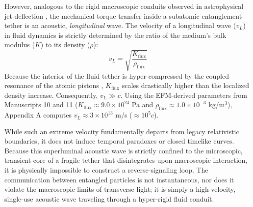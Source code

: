 \documentclass[11pt, a4paper]{article}
\begin{document}
  However, analogous to the rigid macroscopic conduits observed in astrophysical jet deflection \cite{marabut2026m3}, the mechanical torque transfer inside a subatomic entanglement tether is an acoustic, \textit{longitudinal} wave. The velocity of a longitudinal wave ($v_L$) in fluid dynamics is strictly determined by the ratio of the medium's bulk modulus ($K$) to its density ($\rho$):
  \begin{equation}
    v_L = \sqrt{\frac{K_{\text{flux}}}{\rho_{\text{flux}}}}
    \label{eq:longitudinal}
  \end{equation}
  Because the interior of the fluid tether is hyper-compressed by the coupled resonance of the atomic pistons \cite{marabut2026m9}, $K_{\text{flux}}$ scales drastically higher than the localized density increase. Consequently, $v_L \gg c$. Using the EFM-derived parameters from Manuscripts 10 and 11 ($K_{\text{flux}} \approx 9.0 \times 10^{24}$ Pa and $\rho_{\text{flux}} \approx 1.0 \times 10^{-3}$ kg/m$^3$), Appendix A computes $v_L \approx 3 \times 10^{13}$ m/s ($\approx 10^5 c$).
  
  While such an extreme velocity fundamentally departs from legacy relativistic boundaries, it does not induce temporal paradoxes or closed timelike curves. Because this superluminal acoustic wave is strictly confined to the microscopic, transient core of a fragile tether that disintegrates upon macroscopic interaction, it is physically impossible to construct a reverse-signaling loop. The communication between entangled particles is not instantaneous, nor does it violate the macroscopic limits of transverse light; it is simply a high-velocity, single-use acoustic wave traveling through a hyper-rigid fluid conduit.
\end{document}
